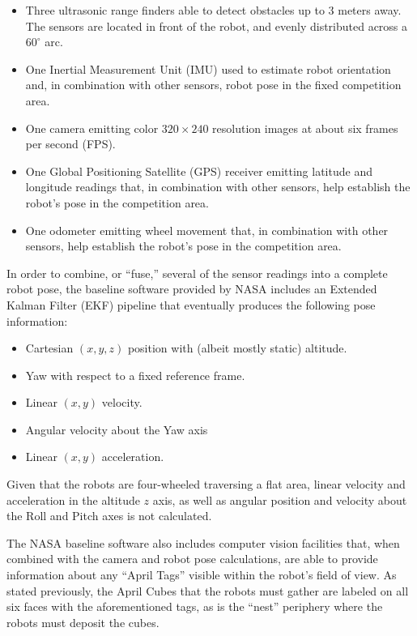 \documentclass[sigconf,authordraft]{acmart}
\begin{document}
\begin{itemize}
  \item Three ultrasonic range finders able to detect obstacles up to 3 meters
  away. The sensors are located in front of the robot, and evenly distributed
  across a $60^{\circ}$ arc.
  \item One Inertial Measurement Unit (IMU) used to estimate robot orientation
  and, in combination with other sensors, robot pose in the fixed competition
  area.
  \item One camera emitting color $320 \times 240$ resolution images at about
  six frames per second (FPS).
  \item One Global Positioning Satellite (GPS) receiver emitting latitude and
  longitude readings that, in combination with other sensors, help establish the
  robot's pose in the competition area.
  \item One odometer emitting wheel movement that, in combination with other
  sensors, help establish the robot's pose in the competition area.
\end{itemize}

In order to combine, or ``fuse,'' several of the sensor readings into a complete
robot pose, the baseline software provided by NASA includes an Extended Kalman
Filter (EKF) pipeline that eventually produces the following pose information:

\begin{itemize}
  \item Cartesian $(x,y,z)$ position with (albeit mostly static) altitude.
  \item Yaw with respect to a fixed reference frame.
  \item Linear $(x,y)$ velocity.
  \item Angular velocity about the Yaw axis
  \item Linear $(x,y)$ acceleration. 
\end{itemize}

Given that the robots are four-wheeled traversing a flat area, linear velocity
and acceleration in the altitude $z$ axis, as well as angular position and
velocity about the Roll and Pitch axes is not calculated.

The NASA baseline software also includes computer vision facilities that, when
combined with the camera and robot pose calculations, are able to provide
information about any ``April Tags'' visible within the robot's field of view.
As stated previously, the April Cubes that the robots must gather are
labeled on all six faces with the aforementioned tags, as is the ``nest''
periphery where the robots must deposit the cubes.
\end{document}
